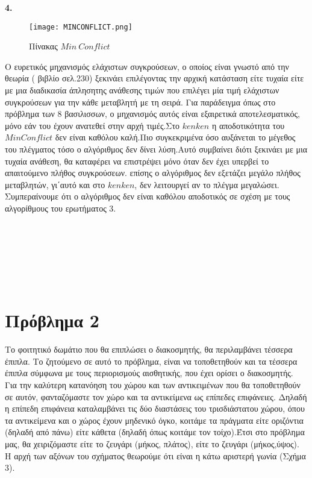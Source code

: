 \documentclass[10pt]{article}
\begin{document}
\vspace{5mm}

\bf 4. \normalfont \\ 

\begin{figure}[H]
    \texttt{[image: MINCONFLICT.png]}\\
    \caption{Πίνακας $Min \ Conflict$}
\end{figure} 

Ο ευρετικός μηχανισμός ελάχιστων συγκρούσεων, ο οποίος είναι γνωστό από την θεωρία ( βιβλίο σελ.230) ξεκινάει επιλέγοντας την αρχική κατάσταση είτε τυχαία είτε με μια διαδικασία άπλησητης ανάθεσης τιμών που επιλέγει μία τιμή ελάχιστων συγκρούσεων για την κάθε μεταβλητή με τη σειρά. Για παράδειγμα όπως στο πρόβλημα των 8 βασιλισσων, ο μηχανισμός αυτός είναι εξαιρετικά αποτελεσματικός, μόνο εάν του έχουν ανατεθεί στην αρχή τιμές.Στο $kenken$ η αποδοτικότητα του $MinConflict$ δεν είναι καθόλου καλή.Πιο συγκεκριμένα όσο αυξάνεται το μέγεθος του πλέγματος τόσο ο αλγόριθμος δεν δίνει λύση.Αυτό συμβαίνει διότι ξεκινάει με μια τυχαία ανάθεση, θα καταφέρει να επιστρέψει μόνο όταν δεν έχει υπερβεί το απαιτούμενο πλήθος συγκρούσεων. επίσης ο αλγόριθμος δεν εξετάζει μεγάλο πλήθος μεταβλητών, γι΄αυτό και στο $kenken$, δεν λειτουργεί αν το πλέγμα μεγαλώσει. Συμπεραίνουμε ότι ο αλγόριθμος δεν είναι καθόλου αποδοτικός σε σχέση με τους αλγορίθμους του ερωτήματος 3. \\ \\ \\ \\ \\ \\ \\   


\section*{Πρόβλημα 2}
\vspace{5mm}

\hspace{5mm}Το φοιτητικό δωμάτιο που θα επιπλώσει ο διακοσμητής, θα περιλαμβάνει τέσσερα έπιπλα. Το ζητούμενο σε αυτό το πρόβλημα, είναι να τοποθετηθούν και τα τέσσερα έπιπλα σύμφωνα με τους περιορισμούς αισθητικής, που έχει ορίσει ο διακοσμητής. \\

Για την καλύτερη κατανόηση του χώρου και των αντικειμένων που θα τοποθετηθούν σε αυτόν, φανταζόμαστε τον χώρο και τα αντικείμενα ως επίπεδες επιφάνειες. Δηλαδή η επίπεδη επιφάνεια καταλαμβάνει τις δύο διαστάσεις του τρισδιάστατου χώρου, όπου τα αντικείμενα και ο χώρος έχουν μηδενικό όγκο, κοιτάμε τα πράγματα είτε οριζόντια (δηλαδή από πάνω) είτε κάθετα (δηλαδή όπως κοιτάμε τον τοίχο).Έτσι στο πρόβλημα μας, θα χειριζόμαστε είτε το ζευγάρι (μήκος, πλάτος), είτε το ζευγάρι (μήκος,ύψος). Η αρχή των αξόνων του σχήματος θεωρούμε ότι είναι η κάτω αριστερή γωνία (Σχήμα 3).
\end{document}
